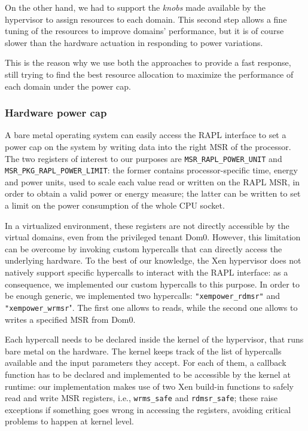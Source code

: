 On the other hand, we had to support the \emph{knobs} made available by the hypervisor to assign resources to each domain. This second step allows a fine tuning of the resources to improve domains' performance, but it is of course slower than the hardware actuation in responding to power variations. 

This is the reason why we use both the approaches to provide a fast response, still trying to find the best resource allocation to maximize the performance of each domain under the power cap.

\subsubsection{Hardware power cap}
A bare metal operating system can easily access the \gls{RAPL} interface to set a power cap on the system by writing data into the right \gls{MSR} of the processor. The two registers of interest to our purposes are \texttt{MSR\_RAPL\_POWER\_UNIT} and \texttt{MSR\_PKG\_RAPL\_POWER\_LIMIT}: the former contains processor-specific time, energy and power units, used to scale each value read or written on the \gls{RAPL} \gls{MSR}, in order to obtain a valid power or energy measure; the latter can be written to set a limit on the power consumption of the whole CPU socket.

In a virtualized environment, these registers are not directly accessible by the virtual domains, even from the privileged tenant Dom0. However, this limitation can be overcome by invoking custom hypercalls that can directly access the underlying hardware. To the best of our knowledge, the Xen hypervisor does not natively support specific hypercalls to interact with the \gls{RAPL} interface: as a consequence, we implemented our custom hypercalls to this purpose. In order to be enough generic, we implemented two hypercalls: \texttt{"xempower\_rdmsr"} and \texttt{"xempower\_wrmsr}". The first one allows to reads, while the second one allows to writes a specified \gls{MSR} from Dom0. 

Each hypercall needs to be declared inside the kernel of the hypervisor, that runs bare metal on the hardware. The kernel keeps track of the list of hypercalls available and the input parameters they accept. For each of them, a callback function has to be declared and implemented to be accessible by the kernel at runtime: our implementation makes use of two Xen build-in functions to safely read and write MSR registers, i.e., \texttt{wrms\_safe} and \texttt{rdmsr\_safe}; these raise exceptions if something goes wrong in accessing the registers, avoiding critical problems to happen at kernel level.

